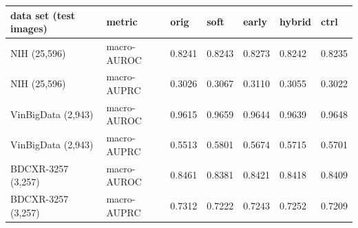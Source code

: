 \begin{tabular}{lllllll}
\toprule
data set (test images) & metric & orig & soft & early & hybrid & ctrl \\
\midrule
NIH (25,596) & macro-AUROC & 0.8241 & 0.8243 & 0.8273 & 0.8242 & 0.8235 \\
NIH (25,596) & macro-AUPRC & 0.3026 & 0.3067 & 0.3110 & 0.3055 & 0.3022 \\
VinBigData (2,943) & macro-AUROC & 0.9615 & 0.9659 & 0.9644 & 0.9639 & 0.9648 \\
VinBigData (2,943) & macro-AUPRC & 0.5513 & 0.5801 & 0.5674 & 0.5715 & 0.5701 \\
BDCXR-3257 (3,257) & macro-AUROC & 0.8461 & 0.8381 & 0.8421 & 0.8418 & 0.8409 \\
BDCXR-3257 (3,257) & macro-AUPRC & 0.7312 & 0.7222 & 0.7243 & 0.7252 & 0.7209 \\
\bottomrule
\end{tabular}
